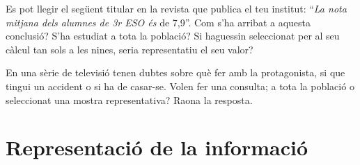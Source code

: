 \begin{mylist}
 \exer Es pot llegir el següent titular en la revista que publica el teu institut: ``\textit{La nota mitjana dels alumnes de 3r ESO és }de 7,9''. Com s'ha arribat a aquesta conclusió? S'ha estudiat a tota la població? Si haguessin seleccionat per al seu càlcul tan sols a les nines, seria representatiu el seu valor?


 \exer En una sèrie de televisió tenen dubtes sobre què fer amb la protagonista, si que tingui un accident o si ha de casar-se. Volen fer una consulta; a tota la població o seleccionat una mostra representativa? Raona la resposta.


\end{mylist}

\section{Representació de la informació}

\begin{center}
\end{center}

